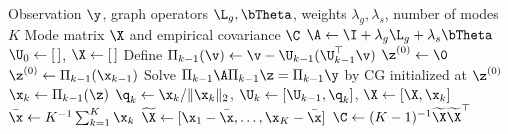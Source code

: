 \begin{algorithm}[H]
\caption{Multi-mode signal generation for GLASSO}
\label{alg:multi_mode_glasso}
\begin{algorithmic}[1]
\Require Observation $\y$, graph operators $\L_g,\bTheta$, weights $\lambda_g,\lambda_s$, number of modes $K$
\Ensure Mode matrix $\X$ and empirical covariance $\C$
\State $\A \gets \I+\lambda_g\L_g+\lambda_s\bTheta$
\State $\U_0 \gets [\,]$, \quad $\X \gets [\,]$
    \State Define $\Pi_{k-1}(\v) \gets \v-\U_{k-1}(\U_{k-1}^{\top}\v)$
        \State $\z^{(0)} \gets \0$
    \Else
        \State $\z^{(0)} \gets \Pi_{k-1}(\x_{k-1})$
    \EndIf
    \State Solve $\Pi_{k-1}\A\Pi_{k-1}\z=\Pi_{k-1}\y$ by CG initialized at $\z^{(0)}$
    \State $\x_k \gets \Pi_{k-1}(\z)$
    \State $\q_k \gets \x_k/\|\x_k\|_2$, \quad $\U_k \gets [\U_{k-1},\q_k]$, \quad $\X \gets [\X,\x_k]$
\EndFor
\State $\bar{\x} \gets K^{-1}\sum_{k=1}^{K}\x_k$
\State $\widetilde{\X} \gets [\x_1-\bar{\x},\ldots,\x_K-\bar{\x}]$
\State $\C \gets (K-1)^{-1}\widetilde{\X}\widetilde{\X}^{\top}$
\end{algorithmic}
\end{algorithm}